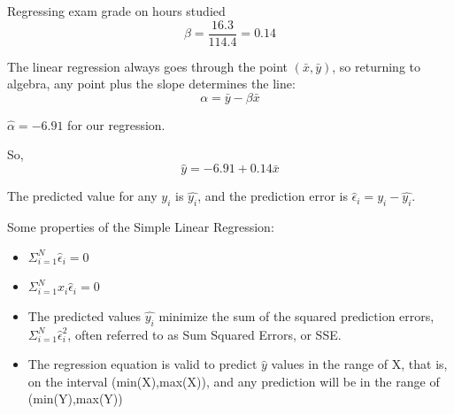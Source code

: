 \documentclass[nohyper,justified]{tufte-handout}\usepackage[]{graphicx}\usepackage[]{color}
\begin{document}
Regressing exam grade on hours studied
\begin{equation*}
{\beta}=\frac{16.3}{114.4}=0.14
\end{equation*}

The linear regression always goes through the point $(\bar{x},\bar{y})$, so returning to algebra, any point plus the slope determines the line:
\begin{equation*}
{\alpha}=\bar{y}-{\beta}\bar{x}
\end{equation*}

$\hat{\alpha}=\ensuremath{-6.91}$ for our regression.

So,
\begin{equation*}
\hat{y}=\ensuremath{-6.91} +0.14\bar{x}
\end{equation*}



The predicted value for any $y_i$ is $\hat{y_i}$, and the prediction error is $\hat{\epsilon}_i=y_i - \hat{y_i}$.

Some properties of the Simple Linear Regression:
\begin{itemize}
  \item $\Sigma_{i=1}^{N} \hat{\epsilon}_i=0 $
  \item $\Sigma_{i=1}^{N} x_i \hat{\epsilon}_i=0 $
  \item The predicted values $\hat{y_i}$ minimize the sum of the squared prediction errors, $\Sigma_{i=1}^{N} \hat{\epsilon}_i^2$, often referred to as Sum Squared Errors, or SSE.
  \item The regression equation is valid to predict $\hat{y}$ values in the range of X, that is, on the interval (min(X),max(X)), and any prediction will be in the range of (min(Y),max(Y))
\end{itemize}
\end{document}
